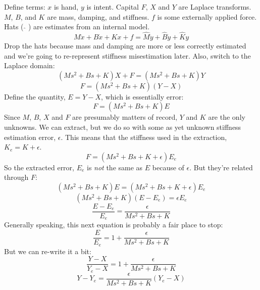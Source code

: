 \documentclass[10pt]{article}
\begin{document}
Define terms: $x$ is hand, $y$ is intent. Capital $F$, $X$ and $Y$ are Laplace transforms. $M$, $B$, and $K$ are mass, damping, and stiffness. $f$ is some externally applied force. Hats ( $\hat{ }$ ) are estimates from an internal model.
\begin{equation}
M\ddot{x}+B\dot{x}+Kx+f=\hat{M}\ddot{y}+\hat{B}\dot{y}+\hat{K}y
\end{equation}
Drop the hats because mass and damping are more or less correctly estimated and we're going to re-represent stiffness misestimation later. Also, switch to the Laplace domain:
\begin{equation}
(Ms^2+Bs+K)X+F=(Ms^2+Bs+K)Y
\end{equation}  
\begin{equation}
F=(Ms^2+Bs+K)(Y-X)
\end{equation}  
Define the quantity, $E=Y-X$, which is essentially error:
\begin{equation}
F=(Ms^2+Bs+K)E
\end{equation} 
Since $M$, $B$, $X$ and $F$ are presumably matters of record, $Y$ and $K$ are the only unknowns. We can extract, but we do so with some as yet unknown stiffness estimation error, $\epsilon$. This means that the stiffness used in the extraction, $K_e=K+\epsilon$.
\begin{equation}
F=(Ms^2+Bs+K+\epsilon)E_e
\end{equation}
So the extracted error, $E_e$ is \textit{not} the same as $E$ because of $\epsilon$. But they're related through $F$:
\begin{equation}
(Ms^2+Bs+K)E=(Ms^2+Bs+K+\epsilon)E_e
\end{equation} 
\begin{equation}
(Ms^2+Bs+K)(E-E_e)=\epsilon E_e
\end{equation} 
\begin{equation}
\frac{E-E_e}{E_e}=\frac{\epsilon}{Ms^2+Bs+K}
\end{equation} 
Generally speaking, this next equation is probably a fair place to stop:
\begin{equation}
\frac{E}{E_e}=1+\frac{\epsilon}{Ms^2+Bs+K}
\end{equation}
But we can re-write it a bit:
\begin{equation}
\frac{Y-X}{Y_e-X}=1+\frac{\epsilon}{Ms^2+Bs+K}
\end{equation} 
\begin{equation}
Y-Y_e=\frac{\epsilon}{Ms^2+Bs+K}(Y_e-X)
\end{equation}
\end{document}
